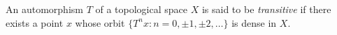 An automorphism $T$ of a topological space $X$ is said to be \emph{transitive} if there exists a point $x$ whose orbit $\{T^n x : n = 0, \pm 1, \pm 2, \ldots\}$ is dense in $X$.
